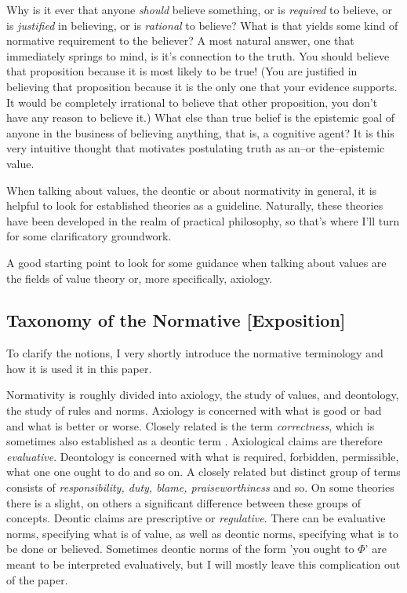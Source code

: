 \documentclass[12pt,numbers=noenddot]{scrartcl}
\begin{document}
Why is it ever that anyone \emph{should} believe something, or is \emph{required} to believe, or is \emph{justified} in believing, or is \emph{rational} to believe? What is that yields some kind of normative requirement to the believer? A most natural answer, one that immediately springs to mind, is it's connection to the truth. You should believe that proposition because it is most likely to be true! (You are justified in believing that proposition because it is the only one that your evidence supports. It would be completely irrational to believe that other proposition, you don't have any reason to believe it.) What else than true belief is the epistemic goal of anyone in the business of believing anything, that is, a cognitive agent? It is this very intuitive thought that motivates postulating truth as an–or the–epistemic value.

When talking about values, the deontic or about normativity in general, it is helpful to look for established theories as a guideline. Naturally, these theories have been developed in the realm of practical philosophy, so that's where I'll turn for some clarificatory groundwork.

A good starting point to look for some guidance when talking about values are the fields of value theory or, more specifically, axiology.

\subsection{ Taxonomy of the Normative [Exposition]}

To clarify the notions, I very shortly introduce the normative terminology and how it is used it in this paper.

Normativity is roughly divided into axiology, the study of values, and deontology, the study of rules and norms. Axiology is concerned with what is good or bad and what is better or worse. Closely related is the term \emph{correctness}, which is sometimes also established as a deontic term \textcite[268f.]{Wedgwood2002-WEDTAO}. Axiological claims are therefore \emph{evaluative}. Deontology is concerned with what is required, forbidden, permissible, what one one ought to do and so on. A closely related but distinct group of terms consists of \emph{responsibility, duty, blame, praiseworthiness} and so. On some theories there is a slight, on others a significant difference between these groups of concepts. Deontic claims are prescriptive or \emph{regulative}. There can be evaluative norms, specifying what is of value, as well as deontic norms, specifying what is to be done or believed. Sometimes deontic norms of the form 'you ought to $\Phi$' are meant to be interpreted evaluatively, but I will mostly leave this complication out of the paper.
\end{document}
